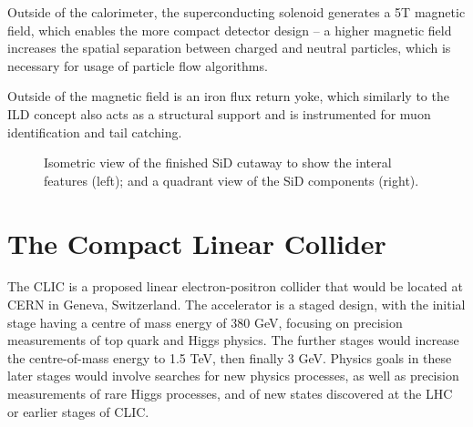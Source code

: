 Outside of the calorimeter, the superconducting solenoid generates a 5T magnetic field, which enables the more compact detector design -- a higher magnetic field increases the spatial separation between charged and neutral particles, which is necessary for usage of particle flow algorithms.

Outside of the magnetic field is an iron flux return yoke, which similarly to the \acrshort{ILD} concept also acts as a structural support and is instrumented for muon identification and tail catching. 

\begin{figure}[t]%
	\centering
    \qquad
    \caption{Isometric view of the finished \acrshort{SiD} cutaway to show the interal features (left); and a quadrant view of the \acrshort{SiD} components (right).}%
    \label{figure:colliders/ILD/double}%
\end{figure}

\section{The Compact Linear Collider}
The \acrfull{CLIC} is a proposed linear electron-positron collider that would be located at \acrshort{CERN} in Geneva, Switzerland. The accelerator is a staged design, with the initial stage having a centre of mass energy of 380 GeV, focusing on precision measurements of top quark and Higgs physics. The further stages would increase the centre-of-mass energy to 1.5 TeV, then finally 3 GeV. Physics goals in these later stages would involve searches for new physics processes, as well as precision measurements of rare Higgs processes, and of new states discovered at the LHC or earlier stages of \acrshort{CLIC}. 

